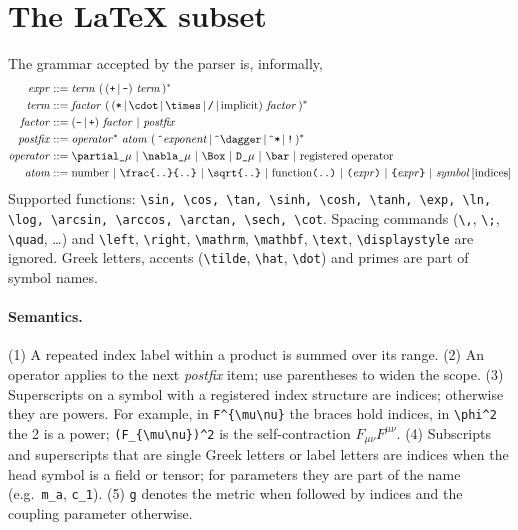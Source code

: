 \section{The \LaTeX{} subset}
\label{app:grammar}

The grammar accepted by the parser is, informally,
\begingroup\small\begin{align*}
\mathit{expr}&::=\mathit{term}\ (\,(\texttt{+}\,|\,\texttt{-})\ \mathit{term}\,)^*\\
\mathit{term}&::=\mathit{factor}\ (\,(\texttt{*}\,|\,\texttt{\textbackslash cdot}\,|\,\texttt{\textbackslash times}\,|\,\texttt{/}\,|\,\text{implicit})\ \mathit{factor}\,)^*\\
\mathit{factor}&::=(\texttt{-}\,|\,\texttt{+})\ \mathit{factor}\ |\ \mathit{postfix}\\
\mathit{postfix}&::=\mathit{operator}^*\ \mathit{atom}\ (\,\texttt{\^{}}\mathit{exponent}\,|\,\texttt{\^{}\textbackslash dagger}\,|\,\texttt{\^{}*}\,|\,\texttt{!}\,)^*\\
\mathit{operator}&::=\texttt{\textbackslash partial\_}\mu\ |\ \texttt{\textbackslash nabla\_}\mu\ |\ \texttt{\textbackslash Box}\ |\ \texttt{D\_}\mu\ |\ \texttt{\textbackslash bar}\ |\ \text{registered operator}\\
\mathit{atom}&::=\text{number}\ |\ \texttt{\textbackslash frac\{..\}\{..\}}\ |\ \texttt{\textbackslash sqrt\{..\}}\ |\ \text{function}\texttt{(..)}\ |\ \texttt{(}\mathit{expr}\texttt{)}\ |\ \texttt{\{}\mathit{expr}\texttt{\}}\ |\ \mathit{symbol}\,[\text{indices}]
\end{align*}\endgroup
Supported functions: \texttt{\textbackslash sin, \textbackslash cos, \textbackslash tan, \textbackslash sinh, \textbackslash cosh, \textbackslash tanh, \textbackslash exp, \textbackslash ln, \textbackslash log, \textbackslash arcsin, \textbackslash arccos, \textbackslash arctan, \textbackslash sech, \textbackslash cot}. Spacing commands (\texttt{\textbackslash ,}, \texttt{\textbackslash ;}, \texttt{\textbackslash quad}, \dots) and \texttt{\textbackslash left}, \texttt{\textbackslash right}, \texttt{\textbackslash mathrm}, \texttt{\textbackslash mathbf}, \texttt{\textbackslash text}, \texttt{\textbackslash displaystyle} are ignored. Greek letters, accents (\texttt{\textbackslash tilde}, \texttt{\textbackslash hat}, \texttt{\textbackslash dot}) and primes are part of symbol names.

\paragraph{Semantics.} (1) A repeated index label within a product is summed over its range. (2) An operator applies to the next \emph{postfix} item; use parentheses to widen the scope. (3) Superscripts on a symbol with a registered index structure are indices; otherwise they are powers. For example, in \verb|F^{\mu\nu}| the braces hold indices, in \verb|\phi^2| the 2 is a power; \verb|(F_{\mu\nu})^2| is the self-contraction $F_{\mu\nu}F^{\mu\nu}$. (4) Subscripts and superscripts that are single Greek letters or label letters are indices when the head symbol is a field or tensor; for parameters they are part of the name (e.g.\ \verb|m_a|, \verb|c_1|). (5) \verb|g| denotes the metric when followed by indices and the coupling parameter otherwise.
